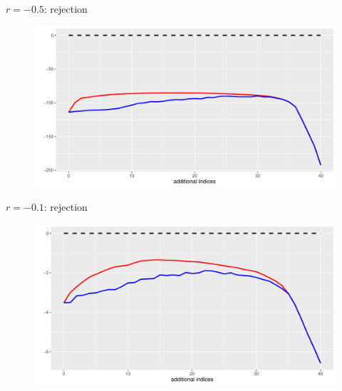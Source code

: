 \documentclass[aspectratio=169]{beamer}
\begin{document}
\begin{frame}{$r=-0.5$: rejection}
\begin{figure}
\centering
\includegraphics[scale=0.6]{plot05n.pdf}
\end{figure}
\end{frame}



\begin{frame}{$r=-0.1$: rejection}
\begin{figure}
\centering
\includegraphics[scale=0.6]{plot01n.pdf}
\end{figure}
\end{frame}


\end{document}
